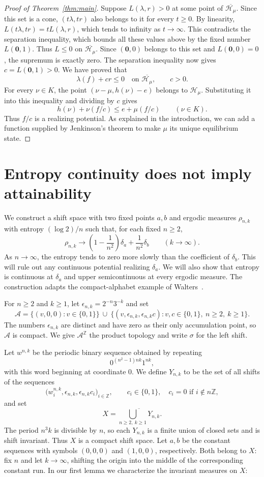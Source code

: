 \documentclass[10pt]{amsart}
\numberwithin{equation}{section}
\newcommand{\Z}{\mathbb Z}
\newcommand{\CH}{\mathcal H}
\newcommand{\zeromeasure}{\mathbf{0}}
\begin{document}
\begin{proof}[Proof of Theorem~\ref{thm:main}]
Suppose $L(\lambda,r)>0$ at some point of $\overline{\CH_\mu}$.
Since this set is a cone, $(t\lambda,tr)$ also belongs to it for
every $t\geq0$. By linearity,
$L(t\lambda,tr)=tL(\lambda,r)$, which tends to infinity as
$t\to\infty$. This contradicts the separation inequality, which
bounds all these values above by the fixed number $L(\zeromeasure,1)$.
Thus $L\leq0$ on $\overline{\CH_\mu}$. Since $(\zeromeasure,0)$ belongs to
this set and $L(\zeromeasure,0)=0$, the supremum is exactly zero. The separation
inequality now gives $c=L(\zeromeasure,1)>0$. We have proved that
\[
 \lambda(f)+cr\leq0\quad\text{on }\overline{\CH_\mu},
 \qquad c>0.
\]
For every $\nu\in K$, the point $(\nu-\mu,h(\nu)-e)$ belongs to
$\CH_\mu$. Substituting it into this inequality and dividing by $c$
gives
\[
 h(\nu)+\nu(f/c)\leq e+\mu(f/c)
 \qquad(\nu\in K).
\]
Thus $f/c$ is a realizing potential. As explained in the introduction,
we can add a function supplied by Jenkinson's theorem to make $\mu$
its unique equilibrium state.
\end{proof}

\section{Entropy continuity does not imply attainability}\label{sec:example}

We construct a shift space with two fixed points $a,b$ and ergodic
measures $\rho_{n,k}$ with entropy $(\log2)/n$ such that, for each
fixed $n\geq2$,
\[
 \rho_{n,k}\longrightarrow
 \left(1-\frac{1}{n^2}\right)\delta_a+\frac{1}{n^2}\delta_b
 \qquad(k\to\infty).
\]
As $n\to\infty$, the entropy tends to zero more slowly than the
coefficient of $\delta_b$. This will rule out any continuous
potential realizing $\delta_a$. We will also show that entropy is
continuous at $\delta_a$ and upper semicontinuous at every ergodic
measure. The construction adapts the compact-alphabet example
of Walters~\cite[Section~2]{walters}.

For $n\geq2$ and $k\geq1$, let $\epsilon_{n,k}=2^{-n}3^{-k}$ and
set
\[
 \mathcal A=
 \{(v,0,0):v\in\{0,1\}\}
 \ \cup\
 \{(v,\epsilon_{n,k},\epsilon_{n,k}c):
      v,c\in\{0,1\},\ n\geq2,\ k\geq1\}.
\]
The numbers $\epsilon_{n,k}$ are distinct and have zero as their only
accumulation point, so $\mathcal A$ is compact. We give
$\mathcal A^\Z$ the product topology and write $\sigma$ for the left
shift.

Let $w^{n,k}$ be the periodic binary sequence obtained by repeating
\[
 0^{(n^2-1)nk}1^{nk},
\]
with this word beginning at coordinate $0$. We define $Y_{n,k}$ to
be the set of all shifts of the sequences
\[
 \bigl(w_i^{n,k},\epsilon_{n,k},\epsilon_{n,k}c_i\bigr)_{i\in\Z},
 \qquad c_i\in\{0,1\},\quad c_i=0\text{ if }i\notin n\Z,
\]
and set
\[
 X=\overline{\bigcup_{n\geq2,\ k\geq1}Y_{n,k}}.
\]
The period $n^3k$ is divisible by $n$, so each $Y_{n,k}$ is a finite
union of closed sets and is shift invariant. Thus $X$ is a compact
shift space. Let $a,b$ be the constant sequences with symbols
$(0,0,0)$ and $(1,0,0)$, respectively. Both belong to $X$: fix $n$
and let $k\to\infty$, shifting the origin into the middle of the
corresponding constant run. In our first lemma we characterize the invariant measures on $X$: 
\end{document}
